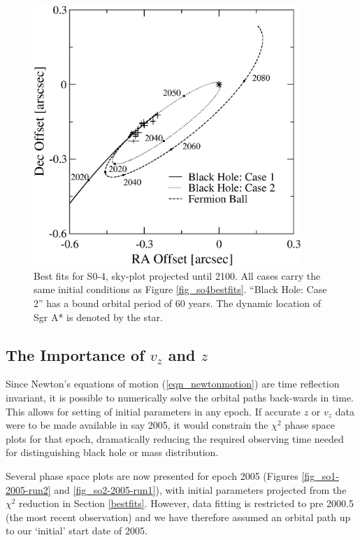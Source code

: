 \begin{figure}[!p]
	\begin{center}
	\includegraphics[width=0.9\textwidth]{eps/skyplot-so4.eps}
	\caption{Best fits for S0-4, sky-plot projected until 2100. All cases carry the same initial conditions as
	Figure \ref{fig_so4bestfits}. ``Black Hole: Case 2'' has a bound orbital period of 60 years. The dynamic
	location of Sgr A* is denoted by the star.}
	\label{fig_so4bestfitssky}
	\end{center}
\end{figure}
\clearpage

\subsection{The Importance of $v_z$ and $z$}
\label{sec_futureps}
Since Newton's equations of motion (\ref{eqn_newtonmotion}) are time reflection invariant, it is possible to numerically solve the
orbital paths back-wards in time.
This allows for setting of initial parameters in any epoch. If accurate $z$ or $v_z$ data were to be made available in say 2005,
it would constrain the $\chi^2$ phase space plots for that epoch, dramatically reducing the required observing time needed
for distinguishing black hole or mass distribution.

Several phase space plots are now presented for epoch 2005 (Figures \ref{fig_so1-2005-run2} and \ref{fig_so2-2005-run1}),
with initial parameters projected from the $\chi^2$ reduction in Section \ref{bestfits}.
However, data fitting is restricted to pre 2000.5 (the most recent observation) and we have therefore assumed
an orbital path up to our `initial' start date of 2005.

